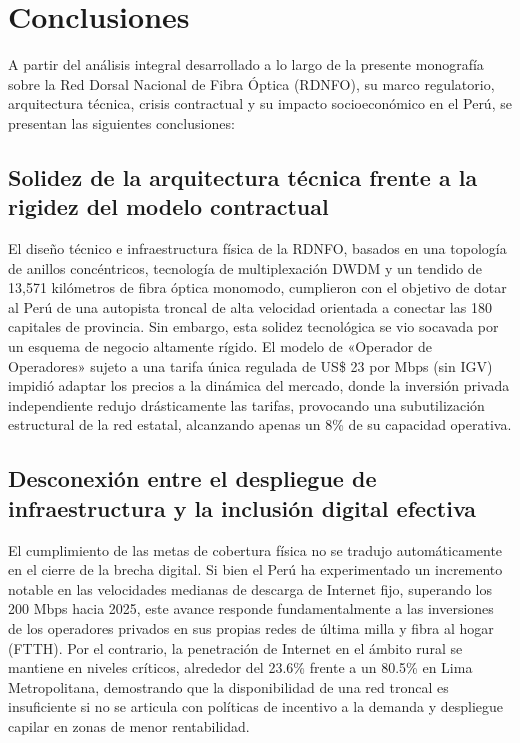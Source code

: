 \section*{Conclusiones}

A partir del análisis integral desarrollado a lo largo de la presente monografía sobre la Red Dorsal Nacional de Fibra Óptica (RDNFO), su marco regulatorio, arquitectura técnica, crisis contractual y su impacto socioeconómico en el Perú, se presentan las siguientes conclusiones:

\subsection*{Solidez de la arquitectura técnica frente a la rigidez del modelo contractual}
El diseño técnico e infraestructura física de la RDNFO, basados en una topología de anillos concéntricos, tecnología de multiplexación DWDM y un tendido de 13,571 kilómetros de fibra óptica monomodo, cumplieron con el objetivo de dotar al Perú de una autopista troncal de alta velocidad orientada a conectar las 180 capitales de provincia. Sin embargo, esta solidez tecnológica se vio socavada por un esquema de negocio altamente rígido. El modelo de «Operador de Operadores» sujeto a una tarifa única regulada de US\$ 23 por Mbps (sin IGV) impidió adaptar los precios a la dinámica del mercado, donde la inversión privada independiente redujo drásticamente las tarifas, provocando una subutilización estructural de la red estatal, alcanzando apenas un 8\% de su capacidad operativa.

\subsection*{Desconexión entre el despliegue de infraestructura y la inclusión digital efectiva}
El cumplimiento de las metas de cobertura física no se tradujo automáticamente en el cierre de la brecha digital. Si bien el Perú ha experimentado un incremento notable en las velocidades medianas de descarga de Internet fijo, superando los 200 Mbps hacia 2025, este avance responde fundamentalmente a las inversiones de los operadores privados en sus propias redes de última milla y fibra al hogar (FTTH). Por el contrario, la penetración de Internet en el ámbito rural se mantiene en niveles críticos, alrededor del 23.6\% frente a un 80.5\% en Lima Metropolitana, demostrando que la disponibilidad de una red troncal es insuficiente si no se articula con políticas de incentivo a la demanda y despliegue capilar en zonas de menor rentabilidad.

